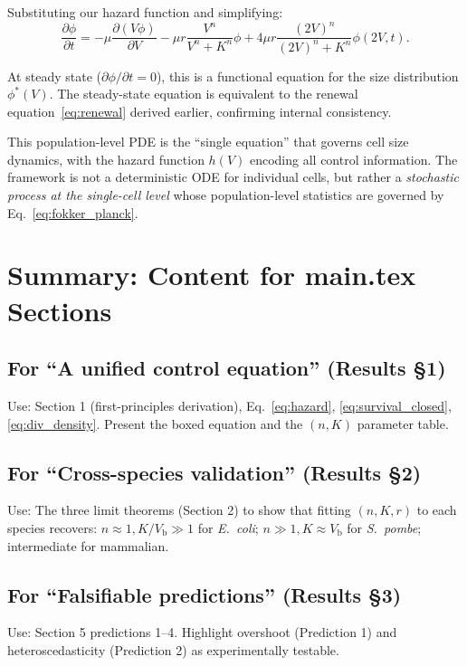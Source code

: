 \documentclass[11pt]{article}
\newcommand{\Vb}{V_{\mathrm{b}}}
\begin{document}
Substituting our hazard function and simplifying:
\begin{equation}
  \frac{\partial \phi}{\partial t} = -\mu\frac{\partial(V\phi)}{\partial V} - \mu r\frac{V^n}{V^n + K^n}\phi + 4\mu r \frac{(2V)^n}{(2V)^n + K^n}\phi(2V, t).
\end{equation}

At steady state ($\partial\phi/\partial t = 0$), this is a functional equation for the size distribution $\phi^*(V)$. The steady-state equation is equivalent to the renewal equation~\eqref{eq:renewal} derived earlier, confirming internal consistency.

This population-level PDE is the ``single equation'' that governs cell size dynamics, with the hazard function $h(V)$ encoding all control information. The framework is not a deterministic ODE for individual cells, but rather a \emph{stochastic process at the single-cell level} whose population-level statistics are governed by Eq.~\eqref{eq:fokker_planck}.

\section{Summary: Content for main.tex Sections}

\subsection*{For ``A unified control equation'' (Results \S1)}
Use: Section 1 (first-principles derivation), Eq.~\eqref{eq:hazard}, \eqref{eq:survival_closed}, \eqref{eq:div_density}. Present the boxed equation and the $(n, K)$ parameter table.

\subsection*{For ``Cross-species validation'' (Results \S2)}
Use: The three limit theorems (Section 2) to show that fitting $(n, K, r)$ to each species recovers: $n \approx 1, K/\Vb \gg 1$ for \textit{E.\ coli}; $n \gg 1, K \approx \Vb$ for \textit{S.\ pombe}; intermediate for mammalian.

\subsection*{For ``Falsifiable predictions'' (Results \S3)}
Use: Section 5 predictions 1--4. Highlight overshoot (Prediction 1) and heteroscedasticity (Prediction 2) as experimentally testable.
\end{document}
